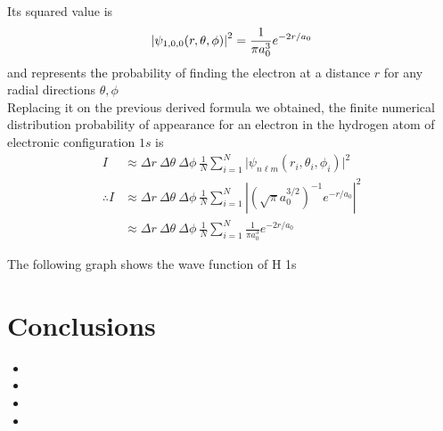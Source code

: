 \documentclass{aa}%
\begin{document}
Its squared value is
\begin{gather}
	\abs{\psi_{1,0,0}(r,\theta,\phi)}^2 = \frac{1}{\pi a_0^3} e^{-2r/a_0}
\end{gather}
and represents the probability of finding the electron at a distance $r$ for any radial directions $\theta,\phi$\\

Replacing it on the previous derived formula we obtained, the finite numerical distribution probability of appearance for an electron in the hydrogen atom of electronic configuration $1s$ is
\begin{align}
	I &\approx \Delta r~\Delta\theta~\Delta\phi ~ \frac{1}{N} \sum_{i=1}^{N} \big|\psi_{n\ell m}(r_i,\theta_i,\phi_i)\big|^2\\
	\therefore I &\approx \Delta r~\Delta\theta~\Delta\phi ~ \frac{1}{N} \sum_{i=1}^{N} \left| \left( \sqrt{\pi}a_0^{3/2} \right)^{-1} e^{-r/a_0} \right|^2\\
	&\approx \Delta r~\Delta\theta~\Delta\phi ~ \frac{1}{N} \sum_{i=1}^{N} \frac{1}{\pi a_0^3} e^{-2r/a_0}
\end{align}

The following graph shows the wave function of H 1s
\begin{center}
\end{center}


\section{Conclusions}
\begin{itemize}
	\item 
	\item 
	\item 
	\item 
\end{itemize}
\end{document}
